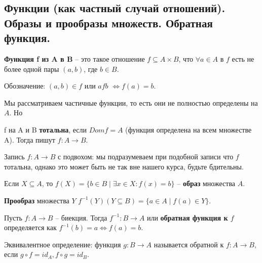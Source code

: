 \subsection{Функции (как частный случай отношений). Образы и прообразы множеств. Обратная функция.}

\textbf{Функция f из A в B} -- это такое отношение $f \subseteq A \times B$, что $\forall a \in A$ в $f$ есть не более одной пары $(a, b)$, где $b \in B$.

Обозначение: $(a, b) \in f$ или $afb$ $\Leftrightarrow f(a) = b$.

Мы рассматриваем частичные функции, то есть они не полностью определены на $A$. Но

f на A и B \textbf{тотальна}, если $Dom f = A$ (функция определена на всем множестве A). Тогда пишут $f: A \rightarrow B$.

Запись $f: A \rightarrow B$ с подвохом: мы подразумеваем при подобной записи что $f$ тотальна, однако это может быть не так вне нашего курса, будьте бдительны.

Если $X \subseteq A$, то $f(X) = \{b \in B \mid \exists x \in X: f(x) = b\}$ -- \textbf{образ} множества $A$.

\textbf{Прообраз} множества $Y$ $f^{-1}(Y) (Y \subseteq B) = \{a \in A \mid f(a) \in Y\}$.

Пусть $f: A \rightarrow B$ -- биекция. Тогда $f^{-1}: B \rightarrow A$ или \textbf{обратная функция к $f$} определяется как $f^{-1}(b) = a \Leftrightarrow f(a) = b$.

Эквивалентное определение: функция $g : B \to A$ называется обратной к $f : A \to B$, если $g \circ f = id_A, f \circ g = id_B$. 
